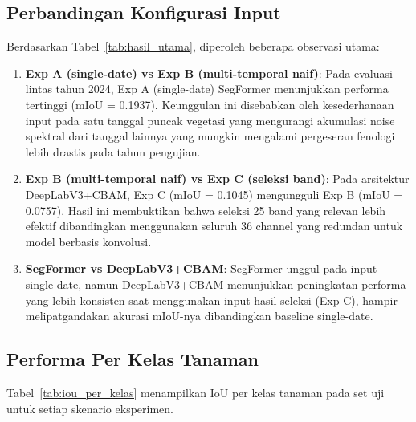 \subsection{Perbandingan Konfigurasi Input}

Berdasarkan Tabel~\ref{tab:hasil_utama}, diperoleh beberapa observasi utama:

\begin{enumerate}
    \item \textbf{Exp A (single-date) vs Exp B (multi-temporal naif)}: Pada evaluasi lintas tahun 2024,
    Exp A (single-date) SegFormer menunjukkan performa tertinggi (mIoU = 0.1937). Keunggulan ini 
    disebabkan oleh kesederhanaan input pada satu tanggal puncak vegetasi yang mengurangi 
    akumulasi noise spektral dari tanggal lainnya yang mungkin mengalami pergeseran fenologi 
    lebih drastis pada tahun pengujian.

    \item \textbf{Exp B (multi-temporal naif) vs Exp C (seleksi band)}: Pada arsitektur 
    DeepLabV3+CBAM, Exp C (mIoU = 0.1045) mengungguli Exp B (mIoU = 0.0757). Hasil ini 
    membuktikan bahwa seleksi 25 band yang relevan lebih efektif dibandingkan menggunakan 
    seluruh 36 channel yang redundan untuk model berbasis konvolusi.

    \item \textbf{SegFormer vs DeepLabV3+CBAM}: SegFormer unggul pada input single-date, 
    namun DeepLabV3+CBAM menunjukkan peningkatan performa yang lebih konsisten saat 
    menggunakan input hasil seleksi (Exp C), hampir melipatgandakan akurasi mIoU-nya 
    dibandingkan baseline single-date.
\end{enumerate}

\subsection{Performa Per Kelas Tanaman}

Tabel~\ref{tab:iou_per_kelas} menampilkan IoU per kelas tanaman pada set uji untuk setiap
skenario eksperimen.

